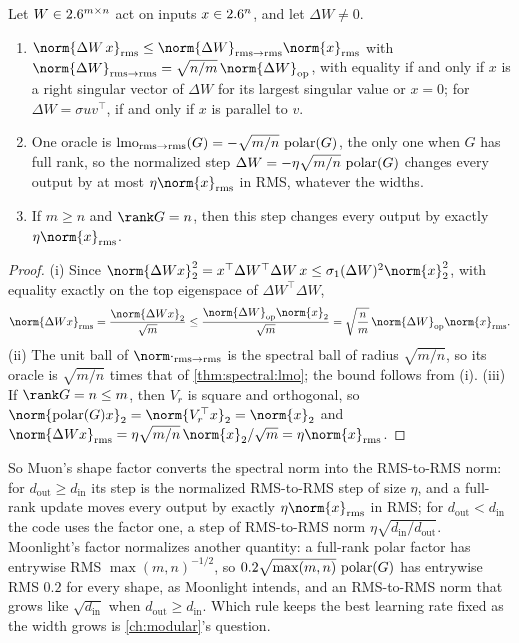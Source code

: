 \begin{refsection}
\begin{proposition}\label{prop:spectral:rms}
Let $W\in2.6^{m\times n}$ act on inputs $x\in2.6^n$, and let $\Delta W\ne0$.
\begin{enumerate}
\item $\norm{\Delta W\,x}_{\rms}\le\norm{\Delta W}_{\rms\to\rms}\norm{x}_{\rms}$ with $\norm{\Delta W}_{\rms\to\rms}=\sqrt{n/m}\,\norm{\Delta W}_{\op}$, with equality if and only if $x$ is a right singular vector of $\Delta W$ for its largest singular value or $x=0$; for $\Delta W=\sigma uv^\top$, if and only if $x$ is parallel to $v$.
\item One oracle is $\operatorname{lmo}_{\mathrm{rms}\to\mathrm{rms}}(G)=-\sqrt{m/n}\,\operatorname{polar}(G)$, the only one when $G$ has full rank, so the normalized step $\Delta W=-\eta\sqrt{m/n}\,\operatorname{polar}(G)$ changes every output by at most $\eta\norm{x}_{\rms}$ in RMS, whatever the widths.
\item If $m\ge n$ and $\rank G=n$, then this step changes every output by exactly $\eta\norm{x}_{\rms}$.
\end{enumerate}
\end{proposition}

\begin{proof}
(i) Since $\norm{\Delta Wx}_2^2=x^\top\Delta W^\top\Delta W\,x\le\sigma_1(\Delta W)^2\norm{x}_2^2$, with equality exactly on the top eigenspace of $\Delta W^\top\Delta W$,
\[
  \norm{\Delta Wx}_{\rms}=\frac{\norm{\Delta Wx}_2}{\sqrt m}\le\frac{\norm{\Delta W}_{\op}\norm{x}_2}{\sqrt m}=\sqrt{\frac nm}\,\norm{\Delta W}_{\op}\norm{x}_{\rms}.
\]
(ii) The unit ball of $\norm\cdot_{\rms\to\rms}$ is the spectral ball of radius $\sqrt{m/n}$, so its oracle is $\sqrt{m/n}$ times that of \cref{thm:spectral:lmo}; the bound follows from (i). (iii) If $\rank G=n\le m$, then $V_r$ is square and orthogonal, so $\norm{\polar(G)x}_2=\norm{V_r^\top x}_2=\norm{x}_2$ and $\norm{\Delta Wx}_{\rms}=\eta\sqrt{m/n}\,\norm{x}_2/\sqrt m=\eta\norm{x}_{\rms}$.
\end{proof}

So Muon's shape factor converts the spectral norm into the RMS-to-RMS norm: for $d_{\mathrm{out}}\ge d_{\mathrm{in}}$ its step is the normalized RMS-to-RMS step of size $\eta$, and a full-rank update moves every output by exactly $\eta\norm{x}_{\rms}$ in RMS; for $d_{\mathrm{out}}<d_{\mathrm{in}}$ the code uses the factor one, a step of RMS-to-RMS norm $\eta\sqrt{d_{\mathrm{in}}/d_{\mathrm{out}}}$. Moonlight's factor normalizes another quantity: a full-rank polar factor has entrywise RMS $\max(m,n)^{-1/2}$, so $0.2\sqrt{\max(m,n)}\,\operatorname{polar}(G)$ has entrywise RMS $0.2$ for every shape, as Moonlight intends, and an RMS-to-RMS norm that grows like $\sqrt{d_{\mathrm{in}}}$ when $d_{\mathrm{out}}\ge d_{\mathrm{in}}$. Which rule keeps the best learning rate fixed as the width grows is \cref{ch:modular}'s question.


\end{refsection}
